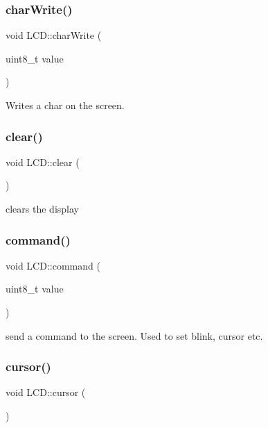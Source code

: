 \subsubsection{\texorpdfstring{char\+Write()}{charWrite()}}
{\footnotesize\ttfamily void L\+C\+D\+::char\+Write (\begin{DoxyParamCaption}\item[{uint8\+\_\+t}]{value }\end{DoxyParamCaption})}



Writes a char on the screen. 

\mbox{\label{class_l_c_d_afa699e0beeeee03cce8cef87eba81c4a}} 
\subsubsection{\texorpdfstring{clear()}{clear()}}
{\footnotesize\ttfamily void L\+C\+D\+::clear (\begin{DoxyParamCaption}{ }\end{DoxyParamCaption})}



clears the display 

\mbox{\label{class_l_c_d_a31a0cb42497d83cdc9cb8000828f7190}} 
\subsubsection{\texorpdfstring{command()}{command()}}
{\footnotesize\ttfamily void L\+C\+D\+::command (\begin{DoxyParamCaption}\item[{uint8\+\_\+t}]{value }\end{DoxyParamCaption})}



send a command to the screen. Used to set blink, cursor etc. 

\mbox{\label{class_l_c_d_a194814f64dfa50a90e07e0fe0d361620}} 
\subsubsection{\texorpdfstring{cursor()}{cursor()}}
{\footnotesize\ttfamily void L\+C\+D\+::cursor (\begin{DoxyParamCaption}{ }\end{DoxyParamCaption})}



